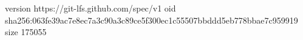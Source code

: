 version https://git-lfs.github.com/spec/v1
oid sha256:063fe39ac7e8ec7a3c90a3c89ce5f300ec1c55507bbddd5eb778bbae7c959919
size 175055
